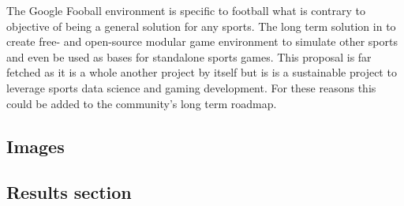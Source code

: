 \documentclass[
    11pt,
    oneside
]{report}
\begin{document}
The Google Fooball environment \cite{gfootball_env} is specific to football what is contrary to objective of being a general solution for any sports. The long term solution in to create free- and open-source modular game environment to simulate other sports and even be used as bases for standalone sports games. This proposal is far fetched as it is a whole another project by itself but is is a sustainable project to leverage sports data science and gaming development. For these reasons this could be added to the community's long term roadmap.



\printbibliography



\appendix
\renewcommand{\thesection}{\Alph{section}.\arabic{section}}
\setcounter{section}{0}
\begin{appendices}


\section{Images}


\subsection{Results section}


\end{appendices}
\end{document}
